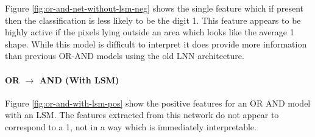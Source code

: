 \noindent
\begin{minipage}[t]{0.5\textwidth}
	\vspace{0cm}
Figure \ref{fig:or-and-net-without-lsm-neg} shows the single feature which if present then the classification is less likely to be the digit 1. This feature appears to be highly active if the pixels lying outside an area which looks like the average 1 shape. While this model is difficult to interpret it does provide more information than previous OR-AND models using the old LNN architecture.
		
\paragraph{OR $\rightarrow$ AND (With LSM)} Figure \ref{fig:or-and-with-lsm-pos} show the positive features for an OR AND model with an LSM. 
The features extracted from this network do not appear to correspond to a 1, not in a way which is immediately interpretable. 
\end{minipage}
\hspace{0.05\textwidth}
